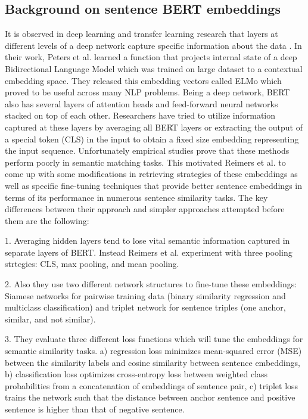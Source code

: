 \subsection{Background on sentence BERT embeddings}
It is observed in deep learning and transfer learning research that layers at different levels of a deep network capture specific information about the data \cite{peters2018dissecting}. In their work, Peters et al. \cite{peters2018deep} learned a function that projects internal state of a deep Bidirectional Language Model which was trained on large dataset to a contextual embedding space. They released this embedding vectors called ELMo which proved to be useful across many NLP problems. Being a deep network, BERT \cite{devlin2018bert} also has several layers of attention heads and feed-forward neural networks stacked on top of each other. Researchers have tried to utilize information captured at these layers by averaging all BERT layers \cite{zhang2019bertscore} or extracting the output of a special token (CLS) in the input \cite{may2019measuring}\cite{qiao2019understanding} to obtain a fixed size embedding representing the input sequence. Unfortunately empirical studies prove that these methods perform poorly in semantic matching tasks. This motivated Reimers et al. \cite{reimers2019sentence} to come up with some modifications in retrieving strategies of these embeddings as well as specific fine-tuning techniques that provide better sentence embeddings in terms of its performance in numerous sentence similarity tasks. The key differences between their approach and simpler approaches attempted before them are the following:

1. Averaging hidden layers tend to lose vital semantic information captured in separate layers of BERT. Instead Reimers et al. experiment with three pooling strtegies: CLS, max pooling, and mean pooling. 

2. Also they use two different network structures to fine-tune these embeddings: Siamese networks for pairwise training data (binary similarity regression and multiclass classification) and triplet network for sentence triples (one anchor, similar, and not similar).

3. They evaluate three different loss functions which will tune the embeddings for semantic similarity tasks. a) regression loss minimizes mean-squared error (MSE) between the similarity labels and cosine similarity between sentence embeddings, b) classification loss optimizes cross-entropy loss between weighted class probabilities from a concatenation of embeddings of sentence pair, c) triplet loss trains the network such that the distance between anchor sentence and positive sentence is higher than that of negative sentence.

